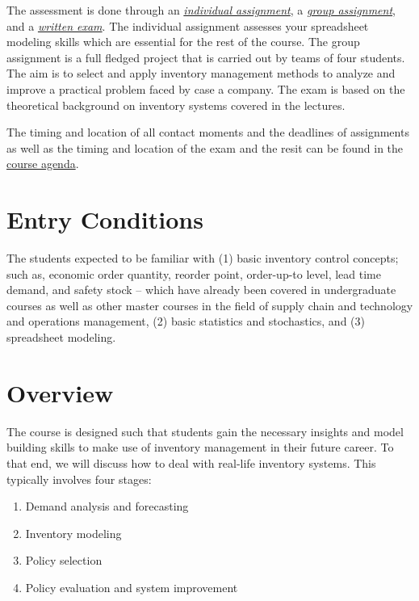 \documentclass{article}
\begin{document}
The assessment is done through an \hyperref[sec:individual]{\textit{individual assignment}}, a \hyperref[sec:group]{\textit{group assignment}}, and a \hyperref[sec:exam]{\textit{written exam}}. The individual assignment assesses your spreadsheet modeling skills which are essential for the rest of the course. The group assignment is a full fledged project that is carried out by teams of four students. The aim is to select and apply inventory management methods to analyze and improve a practical problem faced by case a company. The exam is based on the theoretical background on inventory systems covered in the lectures. 

The timing and location of all contact moments and the deadlines of assignments as well as the timing and location of the exam and the resit can be found in the \hyperref[sec:agenda]{course agenda}.


\section{Entry Conditions}

The students expected to be familiar with (1) basic inventory control concepts; such as, economic order quantity, reorder point, order-up-to level, lead time demand, and safety stock -- which have already been covered in undergraduate courses as well as other master courses in the field of supply chain and technology and operations management, (2) basic statistics and stochastics, and (3) spreadsheet modeling.


\section{Overview}

The course is designed such that students gain the necessary insights and model building skills to make use of inventory management in their future career. To that end, we will discuss how to deal with real-life inventory systems. This typically involves four stages:
\begin{enumerate}
\item Demand analysis and forecasting
\item Inventory modeling
\item Policy selection
\item Policy evaluation and system improvement
\end{enumerate}
\end{document}
